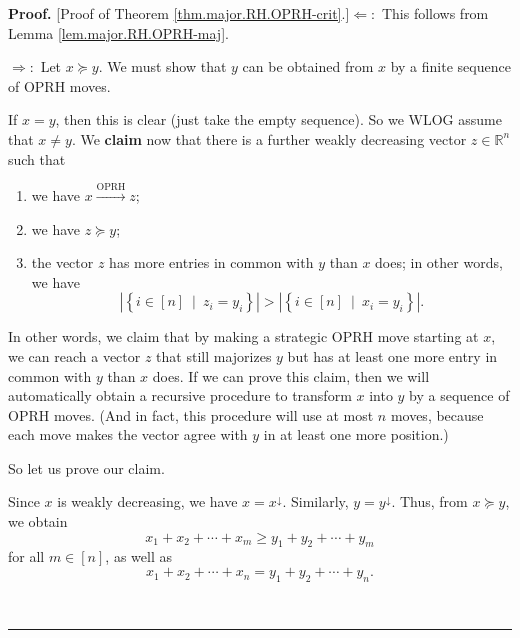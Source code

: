 \documentclass[numbers=enddot,12pt,final,onecolumn,notitlepage]{scrartcl}%
\numberwithin{exer}{subsection}
\theoremstyle{definition}
\newenvironment{proof}[1][Proof]{\noindent\textbf{#1.} }{\ \rule{0.5em}{0.5em}}
\begin{document}
\begin{proof}
[Proof of Theorem \ref{thm.major.RH.OPRH-crit}.]$\Longleftarrow:$ This follows
from Lemma \ref{lem.major.RH.OPRH-maj}. \medskip

$\Longrightarrow:$ Let $x\succcurlyeq y$. We must show that $y$ can be
obtained from $x$ by a finite sequence of OPRH moves.

If $x=y$, then this is clear (just take the empty sequence). So we WLOG assume
that $x\neq y$. We \textbf{claim} now that there is a further weakly
decreasing vector $z\in\mathbb{R}^{n}$ such that

\begin{enumerate}
\item we have $x\overset{\text{OPRH}}{\longrightarrow}z$;

\item we have $z\succcurlyeq y$;

\item the vector $z$ has more entries in common with $y$ than $x$ does; in
other words, we have%
\begin{equation}
\left\vert \left\{  i\in\left[  n\right]  \ \mid\ z_{i}=y_{i}\right\}
\right\vert >\left\vert \left\{  i\in\left[  n\right]  \ \mid\ x_{i}%
=y_{i}\right\}  \right\vert . \label{pf.thm.major.RH.OPRH-crit.s3}%
\end{equation}

\end{enumerate}

In other words, we claim that by making a strategic OPRH move starting at $x$,
we can reach a vector $z$ that still majorizes $y$ but has at least one more
entry in common with $y$ than $x$ does. If we can prove this claim, then we
will automatically obtain a recursive procedure to transform $x$ into $y$ by a
sequence of OPRH moves. (And in fact, this procedure will use at most $n$
moves, because each move makes the vector agree with $y$ in at least one more
position.) \medskip

So let us prove our claim.

Since $x$ is weakly decreasing, we have $x=x^{\downarrow}$. Similarly,
$y=y^{\downarrow}$. Thus, from $x\succcurlyeq y$, we obtain%
\begin{equation}
x_{1}+x_{2}+\cdots+x_{m}\geq y_{1}+y_{2}+\cdots+y_{m}
\label{pf.thm.major.RH.OPRH-crit.1}%
\end{equation}
for all $m\in\left[  n\right]  $, as well as
\begin{equation}
x_{1}+x_{2}+\cdots+x_{n}=y_{1}+y_{2}+\cdots+y_{n}.
\label{pf.thm.major.RH.OPRH-crit.2}%
\end{equation}



\end{proof}
\end{document}

